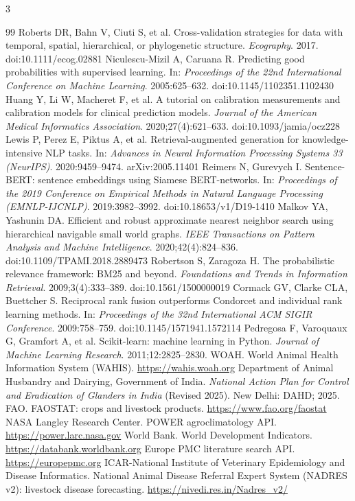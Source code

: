 \documentclass[10pt]{article}
\begin{document}
\begin{multicols}{3}
\begin{thebibliography}{99}
 Roberts DR, Bahn V, Ciuti S, et al. Cross-validation strategies for data with temporal, spatial, hierarchical, or phylogenetic structure. \emph{Ecography}. 2017. doi:10.1111/ecog.02881
 Niculescu-Mizil A, Caruana R. Predicting good probabilities with supervised learning. In: \emph{Proceedings of the 22nd International Conference on Machine Learning}. 2005:625--632. doi:10.1145/1102351.1102430
 Huang Y, Li W, Macheret F, et al. A tutorial on calibration measurements and calibration models for clinical prediction models. \emph{Journal of the American Medical Informatics Association}. 2020;27(4):621--633. doi:10.1093/jamia/ocz228
 Lewis P, Perez E, Piktus A, et al. Retrieval-augmented generation for knowledge-intensive NLP tasks. In: \emph{Advances in Neural Information Processing Systems 33 (NeurIPS)}. 2020:9459--9474. arXiv:2005.11401
 Reimers N, Gurevych I. Sentence-BERT: sentence embeddings using Siamese BERT-networks. In: \emph{Proceedings of the 2019 Conference on Empirical Methods in Natural Language Processing (EMNLP-IJCNLP)}. 2019:3982--3992. doi:10.18653/v1/D19-1410
 Malkov YA, Yashunin DA. Efficient and robust approximate nearest neighbor search using hierarchical navigable small world graphs. \emph{IEEE Transactions on Pattern Analysis and Machine Intelligence}. 2020;42(4):824--836. doi:10.1109/TPAMI.2018.2889473
 Robertson S, Zaragoza H. The probabilistic relevance framework: BM25 and beyond. \emph{Foundations and Trends in Information Retrieval}. 2009;3(4):333--389. doi:10.1561/1500000019
 Cormack GV, Clarke CLA, Buettcher S. Reciprocal rank fusion outperforms Condorcet and individual rank learning methods. In: \emph{Proceedings of the 32nd International ACM SIGIR Conference}. 2009:758--759. doi:10.1145/1571941.1572114
 Pedregosa F, Varoquaux G, Gramfort A, et al. Scikit-learn: machine learning in Python. \emph{Journal of Machine Learning Research}. 2011;12:2825--2830.
 WOAH. World Animal Health Information System (WAHIS). \url{https://wahis.woah.org}
 Department of Animal Husbandry and Dairying, Government of India. \emph{National Action Plan for Control and Eradication of Glanders in India} (Revised 2025). New Delhi: DAHD; 2025.
 FAO. FAOSTAT: crops and livestock products. \url{https://www.fao.org/faostat}
 NASA Langley Research Center. POWER agroclimatology API. \url{https://power.larc.nasa.gov}
 World Bank. World Development Indicators. \url{https://databank.worldbank.org}
 Europe PMC literature search API. \url{https://europepmc.org}
 ICAR-National Institute of Veterinary Epidemiology and Disease Informatics. National Animal Disease Referral Expert System (NADRES v2): livestock disease forecasting. \url{https://nivedi.res.in/Nadres_v2/}
\end{thebibliography}
\end{multicols}
\end{document}
